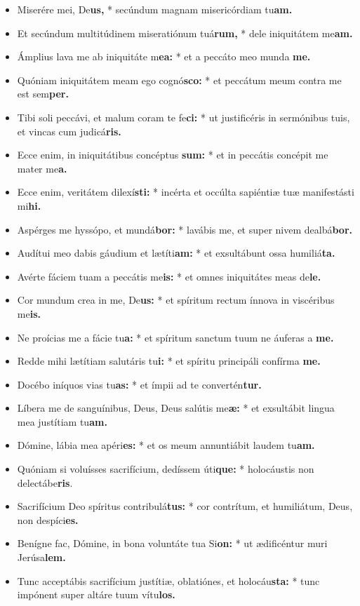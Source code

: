 \begin{multicols}{2}
\begin{itemize}[%
label=\null, %
leftmargin=0pt, %
itemindent=3mm, %
labelsep=0pt, %
labelwidth=0pt, %
rightmargin=0pt, %
parsep=0pt, %
topsep=0pt, %
itemsep=0pt]%


\item Miserére mei, De\textbf{us,} * secúndum magnam misericórdiam tu\textbf{am.}
\item Et secúndum multitúdinem miseratiónum tuá\textbf{rum,} * dele iniquitátem me\textbf{am.}
\item Ámplius lava me ab iniquitáte m\textbf{ea:} * et a peccáto meo munda \textbf{me.}
\item Quóniam iniquitátem meam ego cognó\textbf{sco:} * et peccátum meum contra me est sem\textbf{per.}
\item Tibi soli peccávi, et malum coram te fe\textbf{ci:} * ut justificéris in sermónibus tuis, et vincas cum judicá\textbf{ris.}
\item Ecce enim, in iniquitátibus concéptus \textbf{sum:} * et in peccátis concépit me mater me\textbf{a.}
\item Ecce enim, veritátem dilexí\textbf{sti:} * incérta et occúlta sapiéntiæ tuæ manifestásti mi\textbf{hi.}
\item Aspérges me hyssópo, et mundá\textbf{bor:} * lavábis me, et super nivem dealbá\textbf{bor.}
\item Audítui meo dabis gáudium et lætíti\textbf{am:} * et exsultábunt ossa humiliá\textbf{ta.}
\item Avérte fáciem tuam a peccátis me\textbf{is:} * et omnes iniquitátes meas de\textbf{le.}
\item Cor mundum crea in me, De\textbf{us: }* et spíritum rectum ínnova in viscéribus me\textbf{is.
}\item Ne proícias me a fácie tu\textbf{a:} * et spíritum sanctum tuum ne áuferas a \textbf{me.}
\item Redde mihi lætítiam salutáris tu\textbf{i:} * et spíritu principáli confírma \textbf{me.}
\item Docébo iníquos vias tu\textbf{as:} * et ímpii ad te convertén\textbf{tur.}
\item Líbera me de sanguínibus, Deus, Deus salútis me\textbf{æ:} * et exsultábit lingua mea justítiam tu\textbf{am.}
\item Dómine, lábia mea apéri\textbf{es:} * et os meum annuntiábit laudem tu\textbf{am.}
\item Quóniam si voluísses sacrifícium, dedíssem úti\textbf{que:} * holocáustis non delectábe\textbf{ris}.
\item Sacrifícium Deo spíritus contribulá\textbf{tus:} * cor contrítum, et humiliátum, Deus, non despíci\textbf{es.}
\item Benígne fac, Dómine, in bona voluntáte tua Si\textbf{on:} * ut ædificéntur muri Jerúsa\textbf{lem.}
\item Tunc acceptábis sacrifícium justítiæ, oblatiónes, et holocáu\textbf{sta:} * tunc impónent super altáre tuum vítu\textbf{los.}

\end{itemize}
\end{multicols}